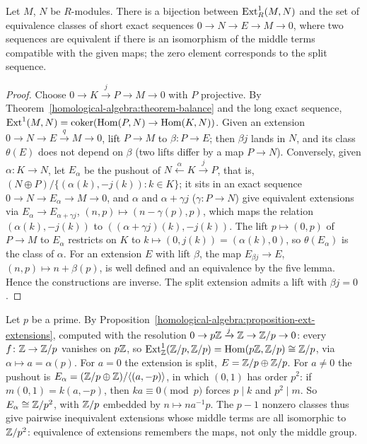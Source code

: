 \begin{proposition}\label{homological-algebra:proposition-ext-extensions}
Let $M$, $N$ be $R$-modules. There is a bijection between $\operatorname{Ext}^1_R(M, N)$ and the set of equivalence classes of short exact
sequences $0 \to N \to E \to M \to 0$, where two sequences are equivalent if there is an isomorphism of the middle terms compatible
with the given maps; the zero element corresponds to the split sequence.
\end{proposition}

\begin{proof}
Choose $0 \to K \xrightarrow{j} P \to M \to 0$ with $P$ projective. By Theorem~\ref{homological-algebra:theorem-balance} and the long
exact sequence, $\operatorname{Ext}^1(M, N) = \operatorname{coker}(\operatorname{Hom}(P, N) \to \operatorname{Hom}(K, N))$. Given an extension $0 \to N \to E \xrightarrow{q} M \to 0$, lift
$P \to M$ to $\beta \colon P \to E$; then $\beta j$ lands in $N$, and its class $\theta(E)$ does not depend on $\beta$ (two lifts differ by a
map $P \to N$). Conversely, given $\alpha \colon K \to N$, let $E_\alpha$ be the pushout of $N \xleftarrow{\alpha} K \xrightarrow{j} P$, that is,
$(N \oplus P)/\{(\alpha(k), -j(k)) : k \in K\}$; it sits in an exact sequence $0 \to N \to E_\alpha \to M \to 0$, and $\alpha$ and
$\alpha + \gamma j$ ($\gamma \colon P \to N$) give equivalent extensions via $E_\alpha \to E_{\alpha + \gamma j}$, $(n, p) \mapsto (n - \gamma(p), p)$, which maps
the relation $(\alpha(k), -j(k))$ to $((\alpha + \gamma j)(k), -j(k))$. The lift $p \mapsto (0, p)$ of $P \to M$ to $E_\alpha$ restricts on $K$ to
$k \mapsto (0, j(k)) = (\alpha(k), 0)$, so $\theta(E_\alpha)$ is the class of $\alpha$. For an extension $E$ with lift $\beta$, the map
$E_{\beta j} \to E$, $(n, p) \mapsto n + \beta(p)$, is well defined and an equivalence by the five lemma. Hence the constructions are
inverse. The split extension admits a lift with $\beta j = 0$.
\end{proof}

\begin{example}\label{homological-algebra:example-ext-zp}
Let $p$ be a prime. By Proposition~\ref{homological-algebra:proposition-ext-extensions}, computed with the resolution $0 \to p\mathbb{Z} \xrightarrow{j} \mathbb{Z} \to \mathbb{Z}/p \to 0$: every $f \colon \mathbb{Z} \to \mathbb{Z}/p$ vanishes on $p\mathbb{Z}$, so
$\operatorname{Ext}^1_{\mathbb{Z}}(\mathbb{Z}/p, \mathbb{Z}/p) = \operatorname{Hom}(p\mathbb{Z}, \mathbb{Z}/p) \cong \mathbb{Z}/p$, via $\alpha \mapsto a = \alpha(p)$. For $a = 0$ the extension is split, $E = \mathbb{Z}/p \oplus \mathbb{Z}/p$. For $a \neq 0$ the pushout is
$E_\alpha = (\mathbb{Z}/p \oplus \mathbb{Z})/\langle(a, -p)\rangle$, in which $(0, 1)$ has order $p^2$: if $m(0, 1) = k(a, -p)$, then $ka \equiv 0 \pmod p$ forces $p \mid k$ and $p^2 \mid m$. So $E_\alpha \cong \mathbb{Z}/p^2$, with $\mathbb{Z}/p$
embedded by $n \mapsto na^{-1}p$. The $p - 1$ nonzero classes thus give pairwise inequivalent extensions whose middle terms are all isomorphic to $\mathbb{Z}/p^2$: equivalence of extensions remembers the maps, not
only the middle group.
\end{example}

